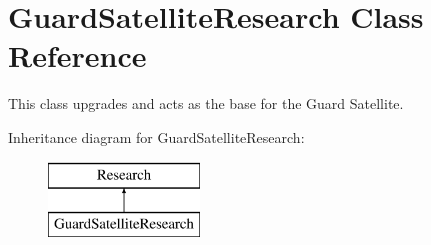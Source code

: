 \hypertarget{class_guard_satellite_research}{}\section{Guard\+Satellite\+Research Class Reference}
\label{class_guard_satellite_research}


This class upgrades and acts as the base for the Guard Satellite.  


Inheritance diagram for Guard\+Satellite\+Research\+:\begin{figure}[H]
\begin{center}
\leavevmode
\includegraphics[height=2.000000cm]{class_guard_satellite_research}
\end{center}
\end{figure}
